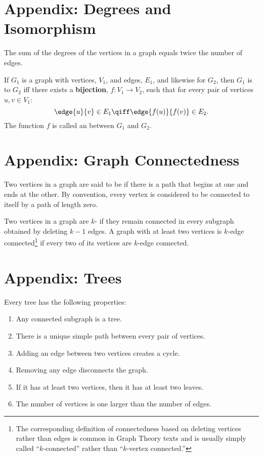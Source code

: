 \documentclass[handout]{mcs}
\begin{document}
\section*{Appendix: Degrees and Isomorphism}

The sum of the degrees of the vertices in a graph equals twice the number
of edges.

  If $G_1$ is a graph with vertices, $V_1$, and edges, $E_1$, and likewise
  for $G_2$, then $G_1$ is  to $G_2$ iff there exists a
  \textbf{bijection}, $f: V_1 \to V_2$, such that for every pair of
  vertices $u, v \in V_1$:
\[
\edge{u}{v} \in E_1 \qiff \edge{f(u)}{f(v)} \in E_2.
\]
The function $f$ is called an  between $G_1$ and
$G_2$.

\section*{Appendix: Graph Connectedness}

  Two vertices in a graph are said to be  if there is a
  path that begins at one and ends at the other.  By convention, every
  vertex is considered to be connected to itself by a path of length zero.

  Two vertices in a graph are $k$- if they remain
  connected in every subgraph obtained by deleting $k-1$ edges.  A graph
  with at least two vertices is $k$-edge connected\footnote{The
    corresponding definition of connectedness based on deleting vertices
    rather than edges is common in Graph Theory texts and is usually
    simply called ``$k$-connected'' rather than ``$k$-vertex connected.''}
  if every two of its vertices are $k$-edge connected.

\section*{Appendix: Trees}

Every tree has the following properties:

\begin{enumerate}
\item Any connected subgraph is a tree.
\item There is a unique simple path between every pair of vertices.
\item Adding an edge between two vertices creates a cycle.
\item Removing any edge disconnects the graph.
\item If it has at least two vertices, then it has at least two leaves.
\item The number of vertices is one larger than the number of edges.
\end{enumerate}
\end{document}
